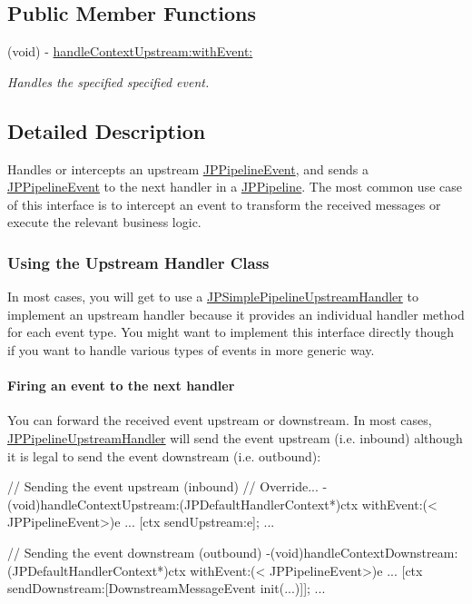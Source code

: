 \subsection*{Public Member Functions}
\begin{DoxyCompactItemize}
\item 
(void) -\/ \hyperlink{a00035_ae561c9fac754928ec4e2bf253c7418d0}{handleContextUpstream:withEvent:}
\begin{DoxyCompactList}\small\item\em Handles the specified specified event. \item\end{DoxyCompactList}\end{DoxyCompactItemize}


\subsection{Detailed Description}
Handles or intercepts an upstream \hyperlink{a00023}{JPPipelineEvent}, and sends a \hyperlink{a00023}{JPPipelineEvent} to the next handler in a \hyperlink{a00019}{JPPipeline}. The most common use case of this interface is to intercept an event to transform the received messages or execute the relevant business logic.

\subsubsection*{Using the Upstream Handler Class}

In most cases, you will get to use a \hyperlink{a00039}{JPSimplePipelineUpstreamHandler} to implement an upstream handler because it provides an individual handler method for each event type. You might want to implement this interface directly though if you want to handle various types of events in more generic way.

\paragraph*{Firing an event to the next handler}

You can forward the received event upstream or downstream. In most cases, \hyperlink{a00035}{JPPipelineUpstreamHandler} will send the event upstream (i.e. inbound) although it is legal to send the event downstream (i.e. outbound):


\begin{DoxyCode}
 // Sending the event upstream (inbound)
 // Override...
 -(void)handleContextUpstream:(JPDefaultHandlerContext*)ctx withEvent:(<
      JPPipelineEvent>)e {
         ...
         [ctx sendUpstream:e];
         ...
 }
 
 // Sending the event downstream (outbound)
  -(void)handleContextDownstream:(JPDefaultHandlerContext*)ctx withEvent:(<
      JPPipelineEvent>)e {
         ...
         [ctx sendDownstream:[DownstreamMessageEvent init(...)]];
         ...
 }
\end{DoxyCode}
 

